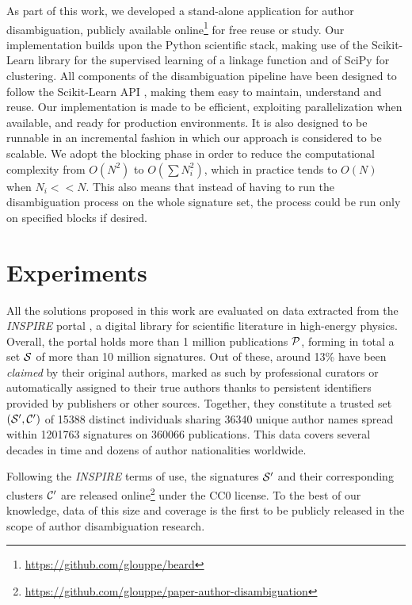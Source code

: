 \documentclass[runningheads,a4paper]{llncs}
\begin{document}
As part of this work, we developed a stand-alone application for author
disambiguation, publicly available online\footnote{\url{https://github.com/glouppe/beard}} for free reuse
or study.
Our implementation builds upon the Python scientific stack, making
use of the Scikit-Learn library \cite{scikitlearn} for the supervised learning
of a linkage function and of SciPy for clustering.
All components of the disambiguation pipeline have been designed to follow the
Scikit-Learn API \cite{scikitlearnAPI}, making them easy to maintain,
understand and reuse.
Our implementation is made to be efficient, exploiting parallelization when available, and ready for production environments.
It is also designed to be runnable in an incremental fashion in which our approach is considered to be scalable. We adopt the blocking phase in order to reduce the computational complexity from $O(N^2)$ to $O(\sum N_i^2)$, which in practice tends to ${O(N)}$ when $N_i << N$. This also means that instead of having to run the disambiguation process on the whole signature set, the process could be run only on specified blocks if desired.


\section{Experiments}
\label{experiments}

All the solutions proposed in this work are evaluated on data extracted from
the \emph{INSPIRE} portal \cite{gentil2009information}, a digital library for scientific literature in
high-energy physics.
Overall, the portal holds more than 1 million publications ${\cal P}$,
forming in total a set ${\cal S}$ of more than 10 million signatures.
Out of these, around 13\% have been \textit{claimed} by their
original authors, marked as such by professional curators or automatically assigned to their true authors thanks
to persistent identifiers provided by publishers or other sources.
Together, they constitute a trusted set $({\cal S}^\prime, {\cal C}^\prime)$ of 15388 distinct individuals sharing
36340 unique author names spread within 1201763 signatures on 360066
publications. This data covers several decades in time and dozens of author
nationalities worldwide.

Following the \emph{INSPIRE} terms of use, the signatures ${\cal S}^\prime$ and their
corresponding clusters ${\cal C}^\prime$ are released
online\footnote{\url{https://github.com/glouppe/paper-author-disambiguation}}
under the CC0 license.
To the best of our knowledge, data of this size and coverage is the first to be publicly
released in the scope of author disambiguation research.
\end{document}
